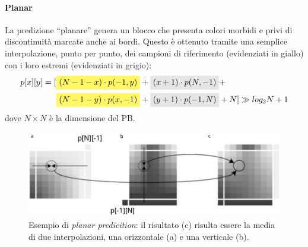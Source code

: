 \paragraph*{Planar} La predizione ``planare'' genera un blocco che presenta 
colori morbidi e privi di discontinuità marcate anche ai bordi. Questo è 
ottenuto tramite una semplice interpolazione, punto per punto, dei campioni di 
riferimento (evidenziati in giallo) con i loro estremi (evidenziati in grigio):
\begin{align*}
p[x][y] = 
[&\fcolorbox{yellow!60}{yellow!60}{$(N-1-x)\cdot p(-1,y)$}+
  \fcolorbox{black!10}{black!10}{$(x+1)\cdot p(N,-1)$}+\\
 &\fcolorbox{yellow!60}{yellow!60}{$(N-1-y)\cdot p(x,-1)$}+
  \fcolorbox{black!10}{black!10}{$(y+1)\cdot p(-1,N)$}+N] \gg log_2N+1
\end{align*} 
dove $N{\times}N$ è la dimensione del PB.

\begin{figure}[H]
  \centering
  \captionsetup{justification=raggedright}
  \includegraphics[scale=0.25]{Figures/Planar}
  \caption[Esempio di \emph{planar prediction}]
          {Esempio di \emph{planar predicition}: il risultato (c) risulta essere
           la media di due interpolazioni, una orizzontale (a) e una verticale 
           (b).}
\end{figure}
 

